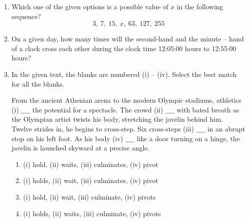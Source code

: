 \documentclass[journal]{IEEEtran}
\begin{document}
\begin{enumerate}
\item Which one of the given options is a possible value of $x$ in the following sequence?  
$$3, \ 7, \ 15, \ x, \ 63, \ 127, \ 255$$  
\hfill {}
\begin{enumerate}
\end{enumerate}

\item On a given day, how many times will the second-hand and the minute -- hand of a clock cross each other during the clock time 12:05:00 hours to 12:55:00 hours?  
\hfill {}
\begin{enumerate}
\end{enumerate}

\item In the given text, the blanks are numbered (i) -- (iv). Select the best match for all the blanks.  

From the ancient Athenian arena to the modern Olympic stadiums, athletics (i) $\_\_\_\_$ the potential for a spectacle. The crowd (ii) $\_\_\_\_$ with bated breath as the Olympian artist twists his body, stretching the javelin behind him. Twelve strides in, he begins to cross-step. Six cross-steps (iii) $\_\_\_\_$ in an abrupt stop on his left foot. As his body (iv) $\_\_\_\_$ like a door turning on a hinge, the javelin is launched skyward at a precise angle.  
\hfill {}  
\begin{enumerate}
\item (i) hold, (ii) waits, (iii) culminates, (iv) pivot  
\item (i) holds, (ii) wait, (iii) culminates, (iv) pivot  
\item (i) hold, (ii) wait, (iii) culminate, (iv) pivots  
\item (i) holds, (ii) waits, (iii) culminate, (iv) pivots  
\end{enumerate}


\end{enumerate}
\end{document}
